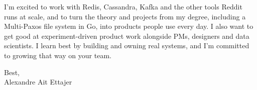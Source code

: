 \documentclass{article}
\begin{document}
I'm excited to work with Redis, Cassandra, Kafka and the other tools Reddit runs at scale, and to turn the theory and projects from my degree, including a Multi-Paxos file system in Go, into products people use every day.
I also want to get good at experiment-driven product work alongside PMs, designers and data scientists.
I learn best by building and owning real systems, and I'm committed to growing that way on your team.

Best, \\
Alexandre Ait Ettajer
\end{document}
